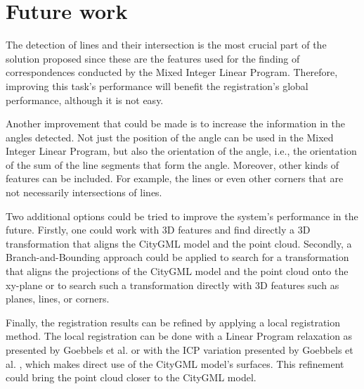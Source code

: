     
    
    \section{Future work}
        The detection of lines and their intersection is the most crucial part of the solution proposed 
        since these are the features used for the finding of correspondences conducted by the Mixed Integer Linear Program. 
        Therefore, improving this task’s performance will benefit the registration’s global performance, although it is not easy.

        Another improvement that could be made is to increase the information in the angles detected. 
        Not just the position of the angle can be used in the Mixed Integer Linear Program, but also the orientation of the angle, 
        i.e., the orientation of the sum of the line segments that form the angle.
        Moreover, other kinds of features can be included. For example, the lines or even other corners that are not necessarily intersections of lines.

        Two additional options could be tried to improve the system’s performance in the future. 
        Firstly, one could work with 3D features and find directly a 3D transformation that aligns the CityGML model and the point cloud. 
        Secondly, a Branch-and-Bounding approach \cite{Bazin_2013_abranchandbound,Breuel_2003_implementation,Brown_2015_globally,Brown_2019_afamily} 
        could be applied to search for a transformation that aligns the projections of the CityGML model and the point cloud onto the xy-plane 
        or to search such a transformation directly with 3D features such as planes, lines, or corners.  

        Finally, the registration results can be refined by applying a local registration method. 
        The local registration can be done with a Linear Program relaxation as presented by Goebbels et al. \cite{Goebbels_2018_alinear, Goebbels_2018_linebased} 
        or with the ICP variation presented by Goebbels et al. \cite{Goebbels_2019_icpcitygml}, which makes direct use of the CityGML model’s surfaces. 
        This refinement could bring the point cloud closer to the CityGML model.



